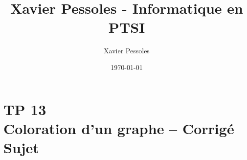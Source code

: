 \documentclass[
	fontsize=10pt, %
	twoside=true, %
]{kaobook}
\newcommand{\repRel}{../../../..}
\newcommand{\repStyle}{\repRel/Style}
\begin{document}

\titlehead{Xavier Pessoles - Informatique en PTSI}
\title[Xavier Pessoles - Informatique en PTSI]{Xavier Pessoles - Informatique en PTSI}
\author[XP]{Xavier Pessoles}
\date{\today}


\begingroup %
\endgroup

%
\mainmatter %
%
%
%
%


\setcounter{margintocdepth}{\sectiontocdepth}
\marginlayout
\graphicspath{{\repStyle/png}}

\pagestyle{xp.scrheadings}


%



\newcommand{\repExo}{}
\newcommand{\nomExo}{}

\livrettrue %
\livrettrue
\colletrue








\chapter*{TP 13 \\ 
Coloration d'un graphe -- \ifprof Corrigé \else Sujet \fi}

\iflivret {} \else
\ifprof  {} \else \fi
\fi





\renewcommand{\repExo}{\repRel/Informatique/Exercices/S2_06_Graphes/}
\renewcommand{\nomExo}{12_coloration_ccinp}
\graphicspath{{\repStyle/png}{\repExo\nomExo/images}}

\end{document}
